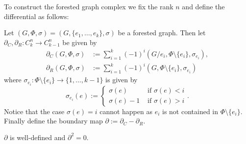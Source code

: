 To construct the forested graph complex we fix the rank $n$ and define the differential as follows:
\begin{definition}
	Let $(G,\Phi,\sigma) = (G, \{e_1,\ldots,e_{k}\},\sigma)$ be a forested graph. Then let $\partial_{C}, \partial_{R}: C_{k}^{n} \to C_{k-1}^{n}$ be given by
	\begin{align*}
		\partial_{C}(G,\Phi,\sigma) &:= \sum_{i = 1}^{k} (-1)^{i} (G / e_{i}, \Phi \setminus \{e_{i}\}, \sigma_{e_{i}}),\\
		\partial _{R}(G,\Phi,\sigma) &:= \sum_{i = 1}^{k} (-1)^{i} (G,\Phi \setminus \{e_{i}\}, \sigma_{e_{i}}) 
	\end{align*}
	where $\sigma_{e_{i}}: \Phi \setminus \{e_{i}\} \to \{1,\ldots,k-1\}$ is given by
	\[
		\sigma_{e_{i}}(e) := \begin{cases}
			\sigma(e) & \text{ if }\sigma(e) < i\\
			\sigma(e) - 1 & \text{ if } \sigma(e) > i
		\end{cases}
	.\]
	Notice that the case $\sigma(e) = i$ cannot happen as $e_{i}$ is not contained in $\Phi \setminus \{e_{i}\}$. 
	Finally define the boundary map $\partial := \partial_{C} - \partial_{R}$.
\end{definition}

\begin{proposition}
	$\partial$ is well-defined and $\partial^2 = 0$.
\end{proposition}


